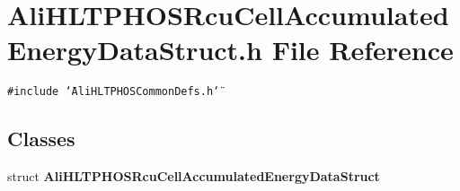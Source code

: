 \section{Ali\-HLTPHOSRcu\-Cell\-Accumulated\-Energy\-Data\-Struct.h File Reference}
\label{AliHLTPHOSRcuCellAccumulatedEnergyDataStruct_8h}


{\tt \#include \char`\"{}Ali\-HLTPHOSCommon\-Defs.h\char`\"{}}\par
\subsection*{Classes}
\begin{CompactItemize}
\item 
struct {\bf Ali\-HLTPHOSRcu\-Cell\-Accumulated\-Energy\-Data\-Struct}
\end{CompactItemize}
